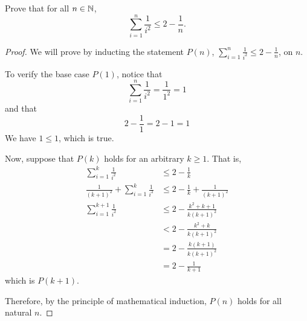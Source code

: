 \question Prove that for all $n\in\mathbb{N}$, \[ \sum_{i=1}^n \frac{1}{i^2} \leq 2-\frac{1}{n}. \]
\begin{proof}
  We will prove by inducting the statement $P(n)$, $\sum_{i=1}^n \frac{1}{i^2} \leq 2-\frac{1}{n}$, on $n$.

  To verify the base case $P(1)$, notice that
  \[ \sum_{i=1}^n \frac{1}{i^2} = \frac{1}{1^2} = 1 \]
  and that
  \[ 2-\frac{1}{1} = 2-1 = 1 \]
  We have $1 \leq 1$, which is true.

  Now, suppose that $P(k)$ holds for an arbitrary $k \geq 1$. That is,
  \begin{align*}
    \sum_{i=1}^k \frac{1}{i^2}                     & \leq 2-\frac{1}{k}                     \\
    \frac{1}{(k+1)^2} + \sum_{i=1}^k \frac{1}{i^2} & \leq 2-\frac{1}{k} + \frac{1}{(k+1)^2} \\
    \sum_{i=1}^{k+1} \frac{1}{i^2}                 & \leq 2-\frac{k^2+k+1}{k(k+1)^2}        \\
                                                   & < 2-\frac{k^2+k}{k(k+1)^2}             \\
                                                   & = 2-\frac{k(k+1)}{k(k+1)^2}            \\
                                                   & = 2-\frac{1}{k+1}
  \end{align*}
  which is $P(k+1)$.

  Therefore, by the principle of mathematical induction, $P(n)$ holds for all natural $n$.
\end{proof}

